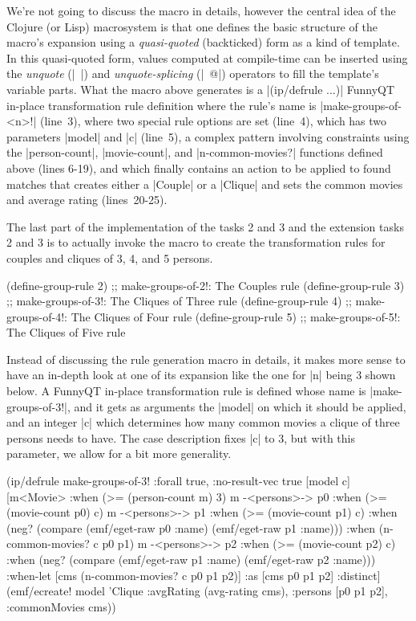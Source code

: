 \documentclass[submission]{eptcs}
\newcommand{\code}{\clojureinline}
\begin{document}
We're not going to discuss the macro in details, however the central idea of
the Clojure (or Lisp) macrosystem is that one defines the basic structure of
the macro's expansion using a \emph{quasi-quoted} (backticked) form as a kind
of template.  In this quasi-quoted form, values computed at compile-time can be
inserted using the \emph{unquote} (\code|~|) and \emph{unquote-splicing}
(\code|~@|) operators to fill the template's variable parts.  What the macro
above generates is a \code|(ip/defrule ...)| FunnyQT in-place transformation
rule definition where the rule's name is \code|make-groups-of-<n>!| (line~3),
where two special rule options are set (line~4), which has two parameters
\code|model| and \code|c| (line~5), a complex pattern involving constraints
using the \code|person-count|, \code|movie-count|, and \code|n-common-movies?|
functions defined above (lines 6-19), and which finally contains an action to
be applied to found matches that creates either a \code|Couple| or a
\code|Clique| and sets the common movies and average rating (lines~20-25).

The last part of the implementation of the tasks 2 and 3 and the extension
tasks 2 and 3 is to actually invoke the macro to create the transformation
rules for couples and cliques of 3, 4, and 5 persons.

\begin{clojurecode}
(define-group-rule 2) ;; make-groups-of-2!: The Couples rule
(define-group-rule 3) ;; make-groups-of-3!: The Cliques of Three rule
(define-group-rule 4) ;; make-groups-of-4!: The Cliques of Four rule
(define-group-rule 5) ;; make-groups-of-5!: The Cliques of Five rule
\end{clojurecode}

Instead of discussing the rule generation macro in details, it makes more sense
to have an in-depth look at one of its expansion like the one for \code|n|
being 3 shown below.  A FunnyQT in-place transformation rule is defined whose
name is \code|make-groups-of-3!|, and it gets as arguments the \code|model| on
which it should be applied, and an integer \code|c| which determines how many
common movies a clique of three persons needs to have.  The case description
fixes \code|c| to 3, but with this parameter, we allow for a bit more
generality.

\begin{clojurecode}
(ip/defrule make-groups-of-3!
  {:forall true, :no-result-vec true}
  [model c]
  [m<Movie>           :when (>= (person-count m) 3)
   m -<persons>-> p0  :when (>= (movie-count p0) c)
   m -<persons>-> p1  :when (>= (movie-count p1) c)
                      :when (neg? (compare (emf/eget-raw p0 :name) (emf/eget-raw p1 :name)))
                      :when (n-common-movies? c p0 p1)
   m -<persons>-> p2  :when (>= (movie-count p2) c)
                      :when (neg? (compare (emf/eget-raw p1 :name) (emf/eget-raw p2 :name)))
   :when-let [cms (n-common-movies? c p0 p1 p2)]
   :as [cms p0 p1 p2] :distinct]
  (emf/ecreate! model 'Clique {:avgRating (avg-rating cms), :persons [p0 p1 p2], :commonMovies cms}))
\end{clojurecode}
\end{document}
